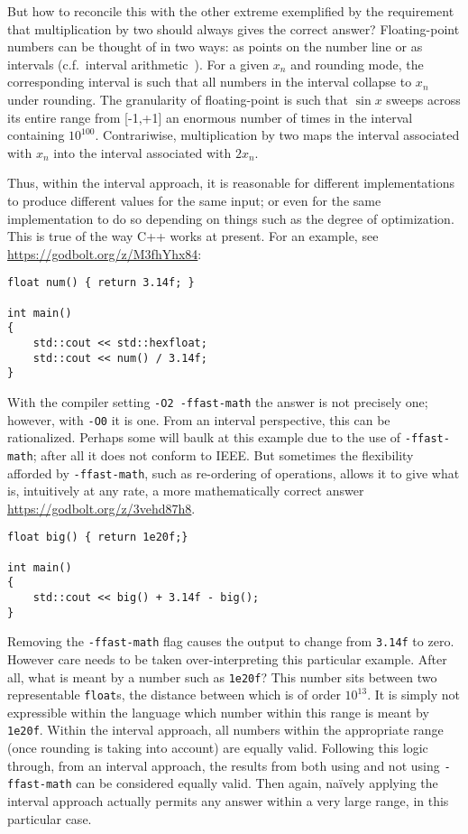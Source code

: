 \documentclass[prd,twocolumn,amsmath,amssymb,nofootinbib,eqsecnum]{revtex4-1}
\newcommand{\code}[1]{{\tt #1}}
\begin{document}
But how to reconcile this with the other extreme exemplified by the requirement that multiplication by two should always gives the correct answer? Floating-point numbers can be thought of in two ways: as points on the number line or as intervals (c.f.\ interval arithmetic~\cite{Interval}). For a given $x_n$ and rounding mode, the corresponding interval is such that all numbers in the interval collapse to $x_n$ under rounding. The granularity of floating-point is such that $\sin x$ sweeps across its entire range from [-1,+1] an enormous number of times in the interval containing $10^{100}$. Contrariwise, multiplication by two maps the interval associated with $x_n$ into the interval associated with $2x_n$.

Thus, within the interval approach, it is reasonable for different implementations to produce different
values for the same input; or even for the same implementation to do so depending on things such as the degree of optimization. This is true of the way C++ works at present. For an example, see \href{https://godbolt.org/z/M3fhYhx84}{https://godbolt.org/z/M3fhYhx84}:
\begin{verbatim}
float num() { return 3.14f; }

int main()
{
    std::cout << std::hexfloat;
    std::cout << num() / 3.14f;
}
\end{verbatim}
With the compiler setting \code{-O2 -ffast-math} the answer is not precisely one; however, with \code{-O0} it is one. From an interval perspective, this can be rationalized. Perhaps some will baulk at this example due to the use of \code{-ffast-math}; after all it does not conform to IEEE. But sometimes the flexibility afforded by \code{-ffast-math}, such as re-ordering of operations, allows it to give what is, intuitively at any rate, a more mathematically correct answer \href{https://godbolt.org/z/3vehd87h8}{https://godbolt.org/z/3vehd87h8}.
\begin{verbatim}
float big() { return 1e20f;}

int main()
{
    std::cout << big() + 3.14f - big();
}
\end{verbatim}
Removing the \code{-ffast-math} flag causes the output to change from \code{3.14f} to zero. However care needs to be taken over-interpreting this particular example. After all, what is meant by a number such as \code{1e20f}? This number sits between two representable \code{float}s, the distance between which is of order $10^{13}$. It is simply not expressible within the language which number within this range is meant by \code{1e20f}. Within the interval approach, all numbers within the appropriate range (once rounding is taking into account) are equally valid. Following this logic through, from an interval approach, the results from both using and not using \code{-ffast-math} can be considered equally valid. Then again, na{\"i}vely applying the interval approach actually permits any answer within a very large range, in this particular case.
\end{document}
